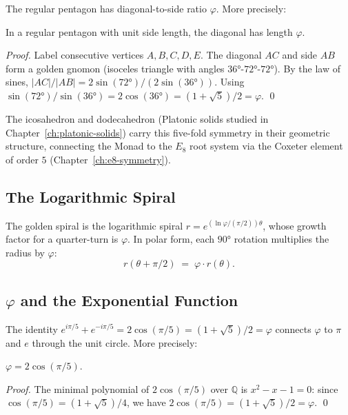 The regular pentagon has diagonal-to-side ratio $\varphi$.  More
precisely:

\begin{lemma}\label{lem:pentagon-ratio}
  In a regular pentagon with unit side length, the diagonal has length
  $\varphi$.
\end{lemma}

\begin{proof}
  Label consecutive vertices $A,B,C,D,E$.  The diagonal $AC$ and side $AB$
  form a golden gnomon (isoceles triangle with angles $36°$-$72°$-$72°$).
  By the law of sines, $|AC|/|AB| = 2\sin(72°)/(2\sin(36°))$.
  Using $\sin(72°)/\sin(36°) = 2\cos(36°) = (1+\sqrt{5})/2 = \varphi$.
  \qed
\end{proof}

The icosahedron and dodecahedron (Platonic solids studied in
Chapter~\ref{ch:platonic-solids}) carry this five-fold symmetry in their
geometric structure, connecting the Monad to the
$E_8$ root system via the Coxeter element of order $5$
(Chapter~\ref{ch:e8-symmetry}).

\subsection{The Logarithmic Spiral}

The golden spiral is the logarithmic spiral $r = e^{(\ln\varphi / (\pi/2))\theta}$,
whose growth factor for a quarter-turn is $\varphi$.  In polar form,
each $90°$ rotation multiplies the radius by $\varphi$:
\[
  r(\theta + \pi/2) \;=\; \varphi \cdot r(\theta).
\]

\subsection{$\varphi$ and the Exponential Function}

The identity $e^{i\pi/5} + e^{-i\pi/5} = 2\cos(\pi/5) = (1+\sqrt{5})/2 = \varphi$
connects $\varphi$ to $\pi$ and $e$ through the unit circle.  More
precisely:

\begin{lemma}\label{lem:phi-trig}
  $\varphi = 2\cos(\pi/5)$.
\end{lemma}

\begin{proof}
  The minimal polynomial of $2\cos(\pi/5)$ over $\mathbb{Q}$ is
  $x^2 - x - 1 = 0$: since $\cos(\pi/5) = (1+\sqrt{5})/4$,
  we have $2\cos(\pi/5) = (1+\sqrt{5})/2 = \varphi$.  \qed
\end{proof}


